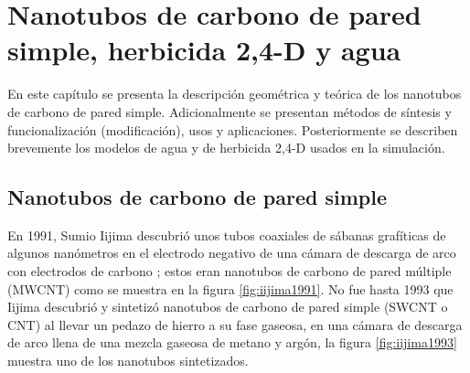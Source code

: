 % 
% 




\chapter{Nanotubos de carbono de pared simple, herbicida 2,4-D y agua}

En este capítulo se presenta la descripción geométrica y teórica de los nanotubos de carbono de pared simple. Adicionalmente se presentan métodos de síntesis y funcionalización (modificación), usos y aplicaciones. Posteriormente se describen brevemente los modelos de agua y de herbicida 2,4-D usados en la simulación.\\


\section{Nanotubos de carbono de pared simple}


En 1991, Sumio Iijima descubrió unos tubos coaxiales de sábanas grafíticas de algunos nanómetros en el electrodo negativo de una cámara de descarga de arco con electrodos de carbono  \cite{Iijima1991}; estos eran nanotubos de carbono de pared múltiple (MWCNT) como se muestra en la figura \ref{fig:iijima1991}. No fue hasta 1993 que Iijima descubrió y sintetizó nanotubos de carbono de pared simple (SWCNT o CNT) \cite{Iijima1993} al llevar un pedazo de hierro a su fase gaseosa, en una cámara de descarga de arco llena de una mezcla gaseosa de metano y argón, la figura \ref{fig:iijima1993} muestra uno de los nanotubos sintetizados.\\


